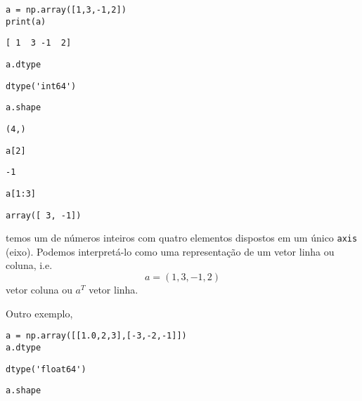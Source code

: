 \documentclass[12pt]{article}
\begin{document}
\begin{lstlisting}
a = np.array([1,3,-1,2])
print(a)
\end{lstlisting}

\begin{verbatim}
[ 1  3 -1  2]
\end{verbatim}

\begin{lstlisting}
a.dtype
\end{lstlisting}

\begin{verbatim}
dtype('int64')
\end{verbatim}

\begin{lstlisting}
a.shape
\end{lstlisting}

\begin{verbatim}
(4,)
\end{verbatim}

\begin{lstlisting}
a[2]
\end{lstlisting}

\begin{verbatim}
-1
\end{verbatim}

\begin{lstlisting}
a[1:3]
\end{lstlisting}

\begin{verbatim}
array([ 3, -1])
\end{verbatim}

temos um {\PYTHONnumpyDOTarray} de números inteiros com quatro elementos dispostos em um único \lstinline+axis+ (eixo). Podemos interpretá-lo como uma representação de um vetor linha ou coluna, i.e.
\begin{equation}
  a = (1, 3, -1, 2)
\end{equation}
vetor coluna ou $a^T$ vetor linha.

Outro exemplo,

\begin{lstlisting}
a = np.array([[1.0,2,3],[-3,-2,-1]])
a.dtype
\end{lstlisting}

\begin{verbatim}
dtype('float64')
\end{verbatim}

\begin{lstlisting}
a.shape
\end{lstlisting}
\end{document}
